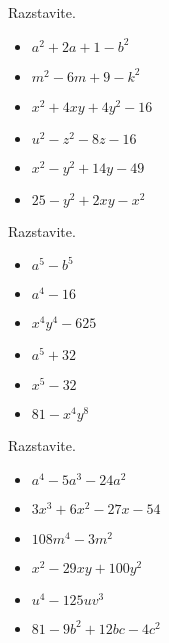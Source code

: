 \begin{multicols}{2}
    
        
            \begin{naloga}
                Razstavite.
                \begin{itemize}
                    \item $a^2+2a+1-b^2$ 
                    \item $m^2-6m+9-k^2$ 
                    \item $x^2+4xy+4y^2-16$ 
                    \item $u^2-z^2-8z-16$ 
                    \item $x^2-y^2+14y-49$ 
                    \item $25-y^2+2xy-x^2$ 
                \end{itemize}
            \end{naloga}
        
    
        
            \begin{naloga}
                Razstavite.
                \begin{itemize}
                    \item $a^5-b^5$ 
                    \item $a^4-16$ 
                    \item $x^4y^4-625$ 
                    \item $a^5+32$ 
                    \item $x^5-32$ 
                    \item $81-x^4y^8$ 
                \end{itemize}
            \end{naloga}
        
    
        
            \begin{naloga}
                Razstavite.
                \begin{itemize}
                    \item $a^4-5a^3-24a^2$ 
                    \item $3x^3+6x^2-27x-54$ 
                    \item $108m^4-3m^2$ 
                    \item $x^2-29xy+100y^2$ 
                    \item $u^4-125uv^3$ 
                    \item $81-9b^2+12bc-4c^2$ 
                \end{itemize}
            \end{naloga}
        
            ~\\~\\~\\~\\~\\~
        \end{multicols}

